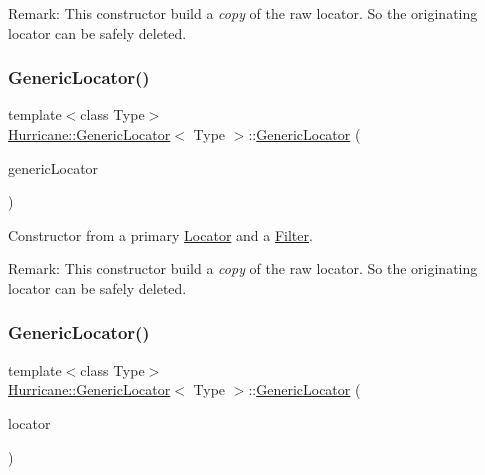 \begin{DoxyParagraph}{Remark\+:}
This constructor build a {\itshape copy} of the raw locator. So the originating locator can be safely deleted. 
\end{DoxyParagraph}
\mbox{\label{classHurricane_1_1GenericLocator_aa314dea86573d1cee1d1eea8ac2ab49e}} 
\subsubsection{\texorpdfstring{Generic\+Locator()}{GenericLocator()}\hspace{0.1cm}{\footnotesize\ttfamily [2/3]}}
{\footnotesize\ttfamily template$<$class Type$>$ \\
\hyperlink{classHurricane_1_1GenericLocator}{Hurricane\+::\+Generic\+Locator}$<$ Type $>$\+::\hyperlink{classHurricane_1_1GenericLocator}{Generic\+Locator} (\begin{DoxyParamCaption}\item[{const \hyperlink{classHurricane_1_1GenericLocator}{Generic\+Locator}$<$ Type $>$ \&}]{generic\+Locator }\end{DoxyParamCaption})\hspace{0.3cm}{\ttfamily [inline]}}

Constructor from a primary \hyperlink{classHurricane_1_1Locator}{Locator} and a \hyperlink{classHurricane_1_1Filter}{Filter}.

\begin{DoxyParagraph}{Remark\+:}
This constructor build a {\itshape copy} of the raw locator. So the originating locator can be safely deleted. 
\end{DoxyParagraph}
\mbox{\label{classHurricane_1_1GenericLocator_a4706b6502b806f90f2374df76791a729}} 
\subsubsection{\texorpdfstring{Generic\+Locator()}{GenericLocator()}\hspace{0.1cm}{\footnotesize\ttfamily [3/3]}}
{\footnotesize\ttfamily template$<$class Type$>$ \\
\hyperlink{classHurricane_1_1GenericLocator}{Hurricane\+::\+Generic\+Locator}$<$ Type $>$\+::\hyperlink{classHurricane_1_1GenericLocator}{Generic\+Locator} (\begin{DoxyParamCaption}\item[{\hyperlink{classHurricane_1_1Locator}{Locator}$<$ Type $>$ $\ast$}]{locator }\end{DoxyParamCaption})\hspace{0.3cm}{\ttfamily [inline]}}

